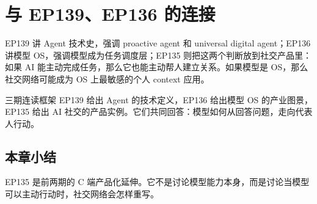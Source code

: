 \section{与 EP139、EP136 的连接}

EP139 讲 Agent 技术史，强调 proactive agent 和 universal digital agent；EP136 讲模型 OS，强调模型成为任务调度层；EP135 则把这两个判断放到社交产品里：如果 AI 能主动完成任务，那么它也能主动帮人建立关系。如果模型是 OS，那么社交网络可能成为 OS 上最敏感的个人 context 应用。

\begin{knowledgebox}{三期连读框架}
EP139 给出 Agent 的技术定义，EP136 给出模型 OS 的产业图景，EP135 给出 AI 社交的产品实例。它们共同回答：模型如何从回答问题，走向代表人行动。
\end{knowledgebox}

\subsection{本章小结}

EP135 是前两期的 C 端产品化延伸。它不是讨论模型能力本身，而是讨论当模型可以主动行动时，社交网络会怎样重写。

